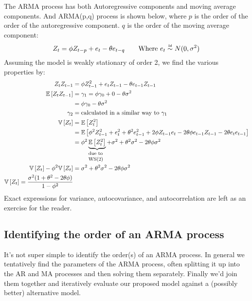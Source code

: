 The ARMA process has both Autoregressive components and moving average
components. And ARMA(p,q) process is shown below, where $p$ is the order of the
order of the autoregressive component. $q$ is the order of the moving average
component:
\begin{equation*}
    \begin{aligned}
        Z_{t} &= \phi Z_{t-p} + e_{t} - \theta e_{t-q} \qquad \text{Where $e_t \iid N(0, \sigma^2)$} \\
    \end{aligned}
\end{equation*}
Assuming the model is weakly stationary of order 2, we find the various
properties by:
\begin{equation*}
    \begin{aligned}
        Z_{t} Z_{t-1} &= \phi Z_{t-1}^{2} + e_{t}Z_{t-1} - \theta
        e_{t-1}Z_{t-1}\\
        \mathbb{E}\left[Z_{t} Z_{t-1}\right] &= \gamma_{1} = \phi \gamma_{0} +
        0 - \theta \sigma^{2}\\
            &= \phi\gamma_{0} - \theta \sigma^{2} \\
        \gamma_{2} &= \text{calculated in a similar way to $\gamma_{1}$} \\
        \mathbb{V}\left[Z_{t}\right] &= \mathbb{E}\left[Z_{t}^{2}\right] \\
            &= \mathbb{E}\left[\phi^{2}Z_{t-1}^{2} + e_{t}^{2} +
            \theta^{2}e_{t-1}^{2} + 2\phi Z_{t-1} e_{t} - 2 \theta \phi
        e_{t-1}Z_{t-1} - 2 \theta e_{t} e_{t-1}\right]  \\
            &= \phi^{2} \explain{\mathbb{E}\left[Z_{t}^{2}\right]}{due to
        WS(2)} + \sigma^{2} + \theta^{2}\sigma^{2} - 2 \theta \phi \sigma^{2} \\
            \mathbb{V}\left[Z_{t}\right] - \phi^{2}
        \mathbb{V}\left[Z_{t}\right] &=  \sigma^{2} + \theta^{2}\sigma^{2} -
        2\theta \phi \sigma^{2} \\
        \mathbb{V}\left[Z_{t}\right] = \frac{\sigma^{2}(1 + \theta^{2} -
        2\theta \phi)}{1 - \phi^{2}}\\
    \end{aligned}
\end{equation*}
Exact expressions for variance, autocovariance, and autocorrelation are left as
an exercise for the reader.

\subsection{Identifying the order of an ARMA process}
It's not super simple to identify the order(s) of an ARMA process. In general
we tentatively find the parameters of the ARMA process, often splitting it up
into the AR and MA processes and then solving them separately. Finally we'd
join them together and iteratively evaluate our proposed model against a
(possibly better) alternative model.

